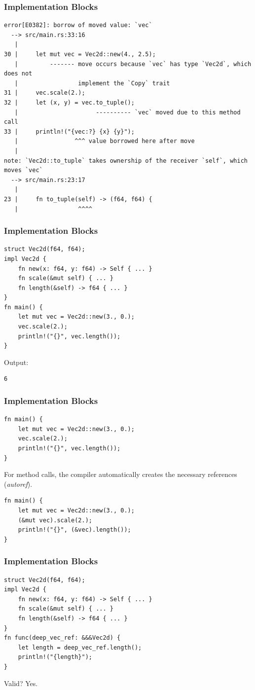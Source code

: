 \begin{frame}[fragile]
    \frametitle{Implementation Blocks}
    \begin{verbatim}
error[E0382]: borrow of moved value: `vec`
  --> src/main.rs:33:16
   |
30 |     let mut vec = Vec2d::new(4., 2.5);
   |         ------- move occurs because `vec` has type `Vec2d`, which does not
   |                 implement the `Copy` trait
31 |     vec.scale(2.);
32 |     let (x, y) = vec.to_tuple();
   |                      ---------- `vec` moved due to this method call
33 |     println!("{vec:?} {x} {y}");
   |                ^^^ value borrowed here after move
   |
note: `Vec2d::to_tuple` takes ownership of the receiver `self`, which moves `vec`
  --> src/main.rs:23:17
   |
23 |     fn to_tuple(self) -> (f64, f64) {
   |                 ^^^^
    \end{verbatim}
\end{frame}

\begin{frame}[fragile]
    \frametitle{Implementation Blocks}
    \begin{verbatim}
struct Vec2d(f64, f64);
impl Vec2d {
    fn new(x: f64, y: f64) -> Self { ... }
    fn scale(&mut self) { ... }
    fn length(&self) -> f64 { ... }
}
fn main() {
    let mut vec = Vec2d::new(3., 0.);
    vec.scale(2.);
    println!("{}", vec.length());
}
    \end{verbatim}
    \pause
    \vfill
    Output:
    \pause
    \begin{verbatim}
6
    \end{verbatim}
\end{frame}

\begin{frame}[fragile]
    \frametitle{Implementation Blocks}
    \begin{verbatim}
fn main() {
    let mut vec = Vec2d::new(3., 0.);
    vec.scale(2.);
    println!("{}", vec.length());
}
    \end{verbatim}
    \vfill
    For method calls, the compiler automatically creates the necessary references (\textit{autoref}).
    \pause
    \vfill
    \begin{verbatim}
fn main() {
    let mut vec = Vec2d::new(3., 0.);
    (&mut vec).scale(2.);
    println!("{}", (&vec).length());
}
    \end{verbatim}
\end{frame}

\begin{frame}[fragile]
    \frametitle{Implementation Blocks}
    \begin{verbatim}
struct Vec2d(f64, f64);
impl Vec2d {
    fn new(x: f64, y: f64) -> Self { ... }
    fn scale(&mut self) { ... }
    fn length(&self) -> f64 { ... }
}
fn func(deep_vec_ref: &&&Vec2d) {
    let length = deep_vec_ref.length();
    println!("{length}");
}
    \end{verbatim}
    \pause
    \vfill
    Valid?
    \pause
    Yes.
\end{frame}

